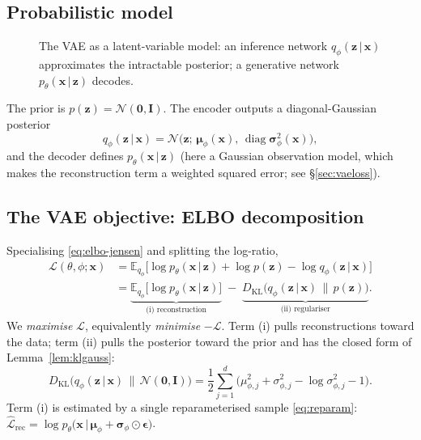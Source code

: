 \documentclass[12pt,a4paper]{article}
\theoremstyle{definition}
\theoremstyle{plain}
\newcommand{\E}{\mathbb{E}}
\newcommand{\N}{\mathcal{N}}
\newcommand{\KL}{D_{\mathrm{KL}}}
\newcommand{\x}{\bm{x}}
\newcommand{\z}{\bm{z}}
\newcommand{\eps}{\bm{\epsilon}}
\newcommand{\II}{\mathbf{I}}
\newcommand{\given}{\,\vert\,}
\DeclareMathOperator{\diag}{diag}
\begin{document}
\subsection{Probabilistic model}
\begin{figure}[h!]
\centering
{}
\caption{The VAE as a latent-variable model: an inference network
$q_\phi(\z\given\x)$ approximates the intractable posterior; a generative network
$p_\theta(\x\given\z)$ decodes.}
\label{fig:vae-graph}
\end{figure}

The prior is $p(\z)=\N(\bm0,\II)$. The encoder outputs a diagonal-Gaussian
posterior
\begin{equation}
q_\phi(\z\given\x)=\N\!\big(\z;\,\bm\mu_\phi(\x),\,\diag\bm\sigma_\phi^2(\x)\big),
\end{equation}
and the decoder defines $p_\theta(\x\given\z)$ (here a Gaussian observation model,
which makes the reconstruction term a weighted squared error; see
\S\ref{sec:vaeloss}).

\subsection{The VAE objective: ELBO decomposition}
Specialising \eqref{eq:elbo-jensen} and splitting the log-ratio,
\begin{align}
\mathcal L(\theta,\phi;\x)
&=\E_{q_\phi}\!\Big[\log p_\theta(\x\given\z)
   +\log p(\z)-\log q_\phi(\z\given\x)\Big]\\
&=\underbrace{\E_{q_\phi}\!\big[\log p_\theta(\x\given\z)\big]}_{\text{(i) reconstruction}}
  \;-\;\underbrace{\KL\!\big(q_\phi(\z\given\x)\,\|\,p(\z)\big)}_{\text{(ii) regulariser}} .
\label{eq:vae-elbo}
\end{align}
We \emph{maximise} $\mathcal L$, equivalently \emph{minimise} $-\mathcal L$. Term
(i) pulls reconstructions toward the data; term (ii) pulls the posterior toward
the prior and has the closed form of Lemma~\ref{lem:klgauss}:
\begin{equation}
\KL\!\big(q_\phi(\z\given\x)\,\|\,\N(\bm0,\II)\big)
=\frac12\sum_{j=1}^{d}\Big(\mu_{\phi,j}^2+\sigma_{\phi,j}^2-\log\sigma_{\phi,j}^2-1\Big).
\label{eq:vae-kl}
\end{equation}
Term (i) is estimated by a single reparameterised sample \eqref{eq:reparam}:
$\widehat{\mathcal L}_{\text{rec}}=\log p_\theta\big(\x\given \bm\mu_\phi+\bm\sigma_\phi\odot\eps\big)$.
\end{document}
